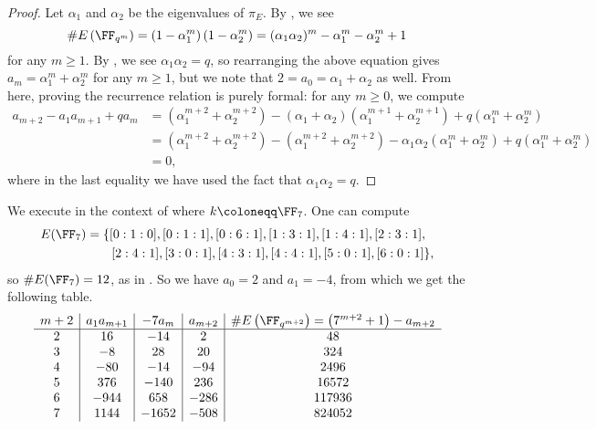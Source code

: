 \documentclass{amsart}
\begin{document}
\begin{proof}
	Let $\alpha_1$ and $\alpha_2$ be the eigenvalues of $\pi_E$. By , we see
	\[\#E\left(\FF_{q^m}\right)=\left(1-\alpha_1^m\right)\left(1-\alpha_2^m\right)=(\alpha_1\alpha_2)^m-\alpha_1^m-\alpha_2^m+1\]
	for any $m\ge1$. By , we see $\alpha_1\alpha_2=q$, so rearranging the above equation gives $a_m=\alpha_1^m+\alpha_2^m$ for any $m\ge1$, but we note that $2=a_0=\alpha_1+\alpha_2$ as well. From here, proving the recurrence relation is purely formal: for any $m\ge0$, we compute
	\begin{align*}
		a_{m+2}-a_1a_{m+1}+qa_m &= \left(\alpha_1^{m+2}+\alpha_2^{m+2}\right)-(\alpha_1+\alpha_2)\left(\alpha_1^{m+1}+\alpha_2^{m+1}\right)+q\left(\alpha_1^m+\alpha_2^m\right) \\
		&= \left(\alpha_1^{m+2}+\alpha_2^{m+2}\right)-\left(\alpha_1^{m+2}+\alpha_2^{m+2}\right)-\alpha_1\alpha_2\left(\alpha_1^m+\alpha_2^m\right)+q\left(\alpha_1^m+\alpha_2^m\right) \\
		&= 0,
	\end{align*}
	where in the last equality we have used the fact that $\alpha_1\alpha_2=q$.
\end{proof}
\begin{example}
	We execute  in the context of  where $k\coloneqq\FF_7$. One can compute
	\begin{align*}
		E(\FF_7) &= \{[0:1:0], [0:1:1], [0:6:1], [1:3:1], [1:4:1], [2:3:1], \\
		&\qquad[2:4:1], [3:0:1], [4:3:1], [4:4:1], [5:0:1], [6:0:1]\},
	\end{align*}
	so $\#E(\FF_7)=12$, as in . So we have $a_0=2$ and $a_1=-4$, from which we get the following table.
	\[\begin{array}{c|c|c|c|c}
		m+2 & a_1a_{m+1} & -7a_m & a_{m+2} & \#E\left(\FF_{q^{m+2}}\right)=\left(7^{m+2}+1\right)-a_{m+2} \\\hline
		2 & 16 & -14 & 2 & 48 \\
		3 & -8 & 28 & 20 & 324 \\
		4 & -80 & -14 & -94 & 2496 \\
		5 & 376 & -140 & 236 & 16572 \\
		6 & -944 & 658 & -286 & 117936 \\
		7 & 1144 & -1652 & -508 & 824052 \\
	\end{array}\]
\end{example}

\printbibliography[title={References}]
\end{document}
